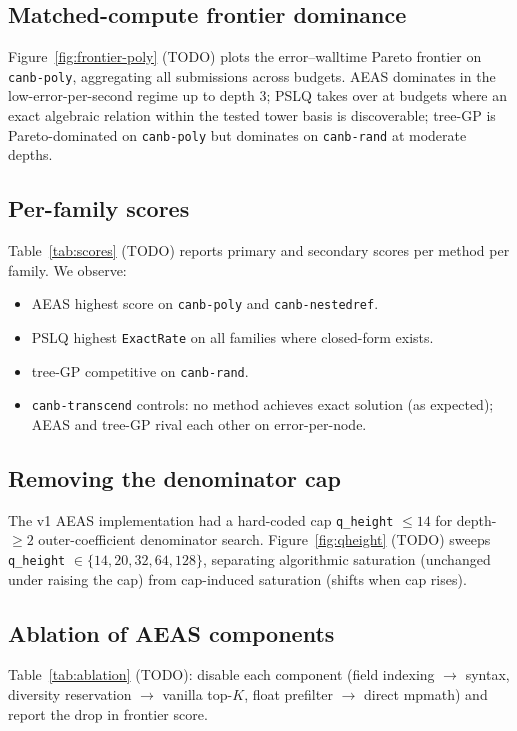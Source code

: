 \documentclass[11pt]{article}
\begin{document}
\subsection{Matched-compute frontier dominance}

Figure~\ref{fig:frontier-poly} (TODO) plots the error--walltime Pareto frontier on \texttt{canb-poly}, aggregating all submissions across budgets. AEAS dominates in the low-error-per-second regime up to depth 3; PSLQ takes over at budgets where an exact algebraic relation within the tested tower basis is discoverable; tree-GP is Pareto-dominated on \texttt{canb-poly} but dominates on \texttt{canb-rand} at moderate depths.

\subsection{Per-family scores}

Table~\ref{tab:scores} (TODO) reports primary and secondary scores per method per family. We observe:
\begin{itemize}
  \item AEAS highest score on \texttt{canb-poly} and \texttt{canb-nestedref}.
  \item PSLQ highest \texttt{ExactRate} on all families where closed-form exists.
  \item tree-GP competitive on \texttt{canb-rand}.
  \item \texttt{canb-transcend} controls: no method achieves exact solution (as expected); AEAS and tree-GP rival each other on error-per-node.
\end{itemize}

\subsection{Removing the denominator cap}

The v1 AEAS implementation had a hard-coded cap \texttt{q\_height} $\le 14$ for depth-$\ge 2$ outer-coefficient denominator search. Figure~\ref{fig:qheight} (TODO) sweeps \texttt{q\_height} $\in \{14, 20, 32, 64, 128\}$, separating algorithmic saturation (unchanged under raising the cap) from cap-induced saturation (shifts when cap rises).

\subsection{Ablation of AEAS components}

Table~\ref{tab:ablation} (TODO): disable each component (field indexing $\to$ syntax, diversity reservation $\to$ vanilla top-$K$, float prefilter $\to$ direct mpmath) and report the drop in frontier score.
\end{document}
